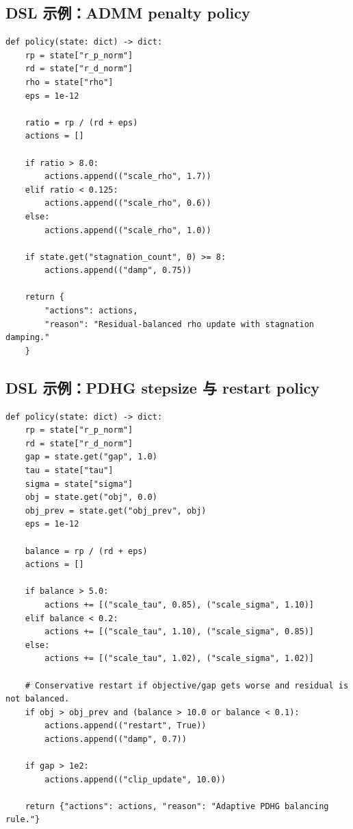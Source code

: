 \documentclass[12pt,a4paper]{ctexart}
\begin{document}
\subsection{DSL 示例：ADMM penalty policy}

\begin{lstlisting}[style=pythonstyle]
def policy(state: dict) -> dict:
    rp = state["r_p_norm"]
    rd = state["r_d_norm"]
    rho = state["rho"]
    eps = 1e-12

    ratio = rp / (rd + eps)
    actions = []

    if ratio > 8.0:
        actions.append(("scale_rho", 1.7))
    elif ratio < 0.125:
        actions.append(("scale_rho", 0.6))
    else:
        actions.append(("scale_rho", 1.0))

    if state.get("stagnation_count", 0) >= 8:
        actions.append(("damp", 0.75))

    return {
        "actions": actions,
        "reason": "Residual-balanced rho update with stagnation damping."
    }
\end{lstlisting}

\subsection{DSL 示例：PDHG stepsize 与 restart policy}

\begin{lstlisting}[style=pythonstyle]
def policy(state: dict) -> dict:
    rp = state["r_p_norm"]
    rd = state["r_d_norm"]
    gap = state.get("gap", 1.0)
    tau = state["tau"]
    sigma = state["sigma"]
    obj = state.get("obj", 0.0)
    obj_prev = state.get("obj_prev", obj)
    eps = 1e-12

    balance = rp / (rd + eps)
    actions = []

    if balance > 5.0:
        actions += [("scale_tau", 0.85), ("scale_sigma", 1.10)]
    elif balance < 0.2:
        actions += [("scale_tau", 1.10), ("scale_sigma", 0.85)]
    else:
        actions += [("scale_tau", 1.02), ("scale_sigma", 1.02)]

    # Conservative restart if objective/gap gets worse and residual is not balanced.
    if obj > obj_prev and (balance > 10.0 or balance < 0.1):
        actions.append(("restart", True))
        actions.append(("damp", 0.7))

    if gap > 1e2:
        actions.append(("clip_update", 10.0))

    return {"actions": actions, "reason": "Adaptive PDHG balancing rule."}
\end{lstlisting}
\end{document}
